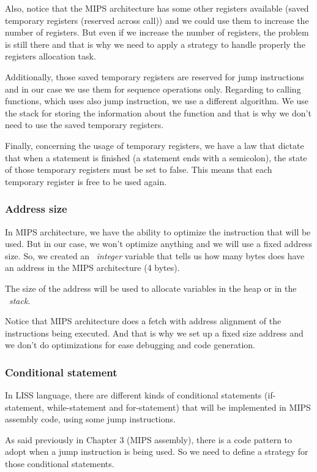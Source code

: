 \documentclass[
  oneside,
  11pt, a4paper,
  footinclude=true,
  headinclude=true,
  cleardoublepage=empty
]{scrbook}
\begin{document}
Also, notice that the MIPS architecture has some other registers available (saved temporary registers (reserved across call)) and we could use them to increase the number of registers.
But even if we increase the number of registers, the problem is still there and that is why we need to apply a strategy to handle properly the registers allocation task.

Additionally, those saved temporary registers are reserved for jump instructions and in our case we use them for sequence operations only. Regarding to calling functions, which uses also jump instruction, we use a different algorithm. We use the stack for storing the information about the function and that is why we don't need to use the saved temporary registers.

Finally, concerning the usage of temporary registers, we have a law that dictate that when a statement is finished (a statement ends with a semicolon), the state of those temporary registers must be set to false. This means that each temporary register is free to be used again.

\subsubsection{Address size}

In MIPS architecture, we have the ability to optimize the instruction that will be used.
But in our case, we won't optimize anything and we will use a fixed address size.
So, we created an ~\textit{integer} variable that tells us how many bytes does have an address in the MIPS architecture (4  bytes). 

The size of the address will be used to allocate variables in the heap or in the ~\textit{stack}.

Notice that MIPS architecture does a fetch with address alignment of the instructions being executed. And that is why we set up a fixed size address and we don't do optimizations for ease debugging and code generation.

\subsubsection{Conditional statement}

In LISS language, there are different kinds of conditional statements (if-statement, while-statement and for-statement) that will be implemented in MIPS assembly code, using some jump instructions.

As said previously in Chapter 3 (MIPS assembly), there is a code pattern to adopt when a jump instruction is being used.
So we need to define a strategy for those conditional statements.
\end{document}

